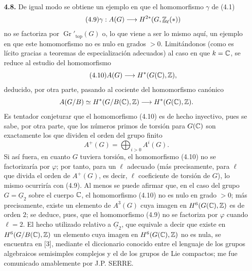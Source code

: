 \textbf{4.8.} De igual modo se obtiene un ejemplo en que el homomorfismo
$\gamma$ de (4.1)
\begin{equation}\tag{4.9}
 \gamma:A(G)\longrightarrow H^{2*}(G,\underline{\mathbb Z}_\ell(*))
\end{equation}
no se factoriza por $\operatorname{Gr}'_{\mathrm{top}}(G)$ o, lo que viene a
ser lo mismo aquí, un ejemplo en que este homomorfismo no es nulo en grados
$>0$. Limitándonos (como es lícito gracias a teoremas de especialización
adecuados) al caso en que $k=\mathbb C$, se reduce al estudio del homomorfismo
\begin{equation}\tag{4.10}
 A(G)\longrightarrow H^*(G(\mathbb C),\mathbb Z),
\end{equation}
deducido, por otra parte, pasando al cociente del homomorfismo canónico
\[
 A(G/B)\simeq H^*(G/B(\mathbb C),\mathbb Z)\longrightarrow H^*(G(\mathbb C),\mathbb Z).
\]
Es tentador conjeturar que el homomorfismo (4.10) es de hecho inyectivo, pues
se sabe, por otra parte, que los números primos de torsión para $G(\mathbb C)$ son
exactamente los que dividen el orden del grupo finito
\[
 A^+(G)=\bigoplus_{i>0}A^i(G).
\]
Si así fuera, en cuanto $G$ tuviera torsión, el homomorfismo (4.10) no se
factorizaría por $\varphi$; por tanto, para un $\ell$ adecuado (más
precisamente, para $\ell$ que divida el orden de $A^+(G)$, es decir, $\ell$
coeficiente de torsión de $G$), lo mismo ocurriría con (4.9). Al menos se puede
afirmar que, en el caso del grupo $G=\underline G_2$ sobre el cuerpo $\mathbb C$, el
homomorfismo (4.10) no es nulo en grado $>0$; más precisamente, existe un
elemento de $A^3(G)$ cuya imagen en $H^6(G(\mathbb C),\mathbb Z)$ es de orden $2$; se
deduce, pues, que el homomorfismo (4.9) no se factoriza por $\varphi$ cuando
$\ell=2$. El hecho utilizado relativo a $\underline G_2$, que equivale a decir que existe
en $H^6(G/B(\mathbb C),\mathbb Z)$ un elemento cuya imagen en $H^6(G(\mathbb C),\mathbb Z)$ no es nula,
se encuentra en [3], mediante el diccionario conocido entre el lenguaje de los
grupos algebraicos semisimples complejos y el de los grupos de Lie compactos;
me fue comunicado amablemente por J.P. SERRE.
